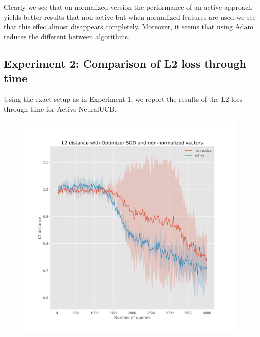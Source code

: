 \documentclass{article}
\begin{document}
Clearly we see that on normalized version the performance of an active approach yields better results that non-active
but when normalized features are used we see that this effec almost disappears completely.
Moreover, it seems that using Adam reduces the different between algorithms.

\subsection{Experiment 2: Comparison of L2 loss through time}
Using the exact setup as in Experiment 1, we report the results of the L2 loss through time for Active-NeuralUCB.
\begin{figure}[!h]
  \centering
  \begin{minipage}{.45\textwidth}
    \centering
    \includegraphics[width=\linewidth]{active-vs-base-moons-l2-loss-SGD-non-normalized-ci}
  \end{minipage}%
  \begin{minipage}{.45\textwidth}
    \centering

\end{minipage}
\end{figure}
\end{document}
